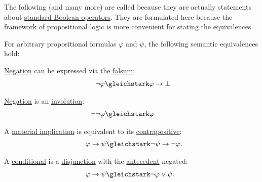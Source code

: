 \begin{proposition}\label{thm:boolean_equivalences}
  The following (and many more) are called  because they are actually statements about \hyperref[def:standard_boolean_operators]{standard Boolean operators}. They are formulated here because the framework of propositional logic is more convenient for stating the equivalences.

  For arbitrary propositional formulas \( \varphi \) and \( \psi \), the following semantic equivalences hold:
  \begin{thmenum}
     \hyperref[def:propositional_language/negation]{Negation} can be expressed via the \hyperref[def:propositional_language/constants/falsum]{falsum}:
    \begin{equation}\label{eq:thm:boolean_equivalences/negation_bottom}
      \begin{split}
        \mathllap{\neg \varphi} &\gleichstark \mathrlap{\varphi \rightarrow \bot}.
      \end{split}
    \end{equation}

     \hyperref[def:propositional_language/negation]{Negation} is an \hyperref[def:set_with_involution]{involution}:
    \begin{equation}\label{eq:thm:boolean_equivalences/double_negation}
      \begin{split}
        \mathllap{\neg \neg \varphi} &\gleichstark \mathrlap{\varphi}.
      \end{split}
    \end{equation}

     A \hyperref[def:material_implication]{material implication} is equivalent to its \hyperref[def:material_implication/contrapositive]{contrapositive}:
    \begin{equation}\label{eq:thm:boolean_equivalences/contrapositive}
      \begin{split}
        \mathllap{\varphi \rightarrow \psi} &\gleichstark \mathrlap{\neg \psi \rightarrow \neg \varphi.}
      \end{split}
    \end{equation}

     A \hyperref[def:propositional_language/connectives/conditional]{conditional} is a \hyperref[def:propositional_language/connectives/disjunction]{disjunction} with the \hyperref[def:material_implication/antecedent]{antecedent} negated:
    \begin{equation}\label{eq:thm:boolean_equivalences/conditional_as_disjunction}
      \begin{split}
        \mathllap{\varphi \rightarrow \psi} &\gleichstark \mathrlap{ \neg \varphi \vee \psi. }
      \end{split}
    \end{equation}


\end{thmenum}
\end{proposition}
